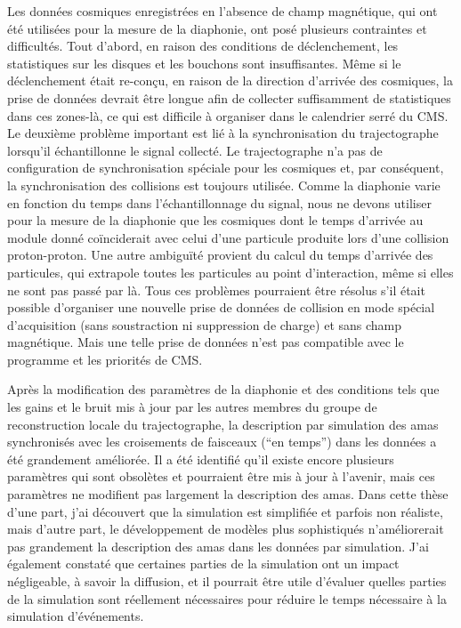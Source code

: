 Les données cosmiques enregistrées en l'absence de champ magnétique, qui ont été utilisées pour la mesure de la diaphonie, ont posé plusieurs contraintes et difficultés. Tout d'abord, en raison des conditions de déclenchement, les statistiques sur les disques et les bouchons sont insuffisantes. Même si le déclenchement était re-conçu, en raison de la direction d'arrivée des cosmiques, la prise de données devrait être longue afin de collecter suffisamment de statistiques dans ces zones-là, ce qui est difficile à organiser dans le calendrier serré du CMS. Le deuxième problème important est lié à la synchronisation du trajectographe lorsqu'il échantillonne le signal collecté. Le trajectographe n'a pas de configuration de synchronisation spéciale pour les cosmiques et, par conséquent, la synchronisation des collisions est toujours utilisée. Comme la diaphonie varie en fonction du temps dans l'échantillonnage du signal, nous ne devons utiliser pour la mesure de la diaphonie que les cosmiques dont le temps d'arrivée au module donné coïnciderait avec celui d'une particule produite lors d'une collision proton-proton. Une autre ambiguïté provient du calcul du temps d'arrivée des particules, qui extrapole toutes les particules au point d'interaction, même si elles ne sont pas passé par là. Tous ces problèmes pourraient être résolus s'il était possible d'organiser une nouvelle prise de données de collision en mode spécial d'acquisition (sans soustraction ni suppression de charge) et sans champ magnétique. Mais une telle prise de données n'est pas compatible avec le programme et les priorités de CMS.


Après la modification des paramètres de la diaphonie et des conditions tels que les gains et le bruit mis à jour par les autres membres du groupe de reconstruction locale du trajectographe, la description par simulation des amas synchronisés avec les croisements de faisceaux (``en temps'') dans les données a été grandement améliorée. Il a été identifié qu'il existe encore plusieurs paramètres qui sont obsolètes et pourraient être mis à jour à l'avenir, mais ces paramètres ne modifient pas largement la description des amas. Dans cette thèse d'une part, j'ai découvert que la simulation est simplifiée et parfois non réaliste, mais d'autre part, le développement de modèles plus sophistiqués n'améliorerait pas grandement la description des amas dans les données par simulation. J'ai également constaté que certaines parties de la simulation ont un impact négligeable, à savoir la diffusion, et il pourrait être utile d'évaluer quelles parties de la simulation sont réellement nécessaires pour réduire le temps nécessaire à la simulation d'événements.

